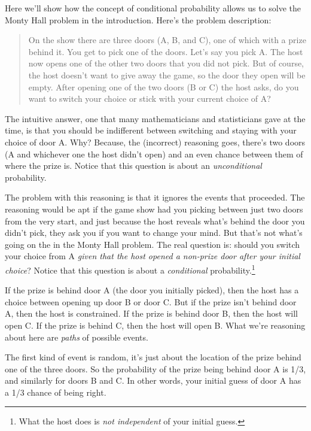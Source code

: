 \documentclass[]{tufte-book}
\begin{document}
Here we'll show how the concept of conditional probability allows us to solve the Monty Hall problem in the introduction. Here's the problem description:

\begin{quote}
On the show there are three doors (A, B, and C), one of which with a prize behind it. You get to pick one of the doors. Let's say you pick A. The host now opens one of the other two doors that you did not pick. But of course, the host doesn't want to give away the game, so the door they open will be empty. After opening one of the two doors (B or C) the host asks, do you want to switch your choice or stick with your current choice of A?
\end{quote}

The intuitive answer, one that many mathematicians and statisticians gave at the time, is that you should be indifferent between switching and staying with your choice of door A. Why? Because, the (incorrect) reasoning goes, there's two doors (A and whichever one the host didn't open) and an even chance between them of where the prize is. Notice that this question is about an \emph{unconditional} probability.

The problem with this reasoning is that it ignores the events that proceeded. The reasoning would be apt if the game show had you picking between just two doors from the very start, and just because the host reveals what's behind the door you didn't pick, they ask you if you want to change your mind. But that's not what's going on the in the Monty Hall problem. The real question is: should you switch your choice from A \emph{given that the host opened a non-prize door after your initial choice}? Notice that this question is about a \emph{conditional} probability.\footnote{What the host does is \emph{not independent} of your initial guess.}

If the prize is behind door A (the door you initially picked), then the host has a choice between opening up door B or door C. But if the prize isn't behind door A, then the host is constrained. If the prize is behind door B, then the host will open C. If the prize is behind C, then the host will open B. What we're reasoning about here are \emph{paths} of possible events.

The first kind of event is random, it's just about the location of the prize behind one of the three doors. So the probability of the prize being behind door A is 1/3, and similarly for doors B and C. In other words, your initial guess of door A has a 1/3 chance of being right.
\end{document}
